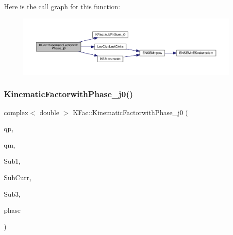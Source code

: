 Here is the call graph for this function\+:
\nopagebreak
\begin{figure}[H]
\begin{center}
\leavevmode
\includegraphics[width=350pt]{d2/d89/namespaceKFac_a8a20f176fbf91758f8699734b8df3f04_cgraph}
\end{center}
\end{figure}
\mbox{\label{namespaceKFac_a87a5304db9d4c659637da23e363cf4a4}} 
\subsubsection{\texorpdfstring{KinematicFactorwithPhase\_j0()}{KinematicFactorwithPhase\_j0()}\hspace{0.1cm}{\footnotesize\ttfamily [2/2]}}
{\footnotesize\ttfamily complex$<$ double $>$ K\+Fac\+::\+Kinematic\+Factorwith\+Phase\+\_\+j0 (\begin{DoxyParamCaption}\item[{Eigen\+::\+Vector\+Xd \&}]{qp,  }\item[{Eigen\+::\+Vector\+Xd \&}]{qm,  }\item[{map$<$ int, Eigen\+::\+Matrix\+Xcd $>$ \&}]{Sub1,  }\item[{map$<$ int, Eigen\+::\+Matrix\+Xcd $>$ \&}]{Sub\+Curr,  }\item[{map$<$ int, Eigen\+::\+Matrix\+Xcd $>$ \&}]{Sub3,  }\item[{\mbox{\hyperlink{structPh_1_1phChars}{Ph\+::ph\+Chars}} \&}]{phase }\end{DoxyParamCaption})}

